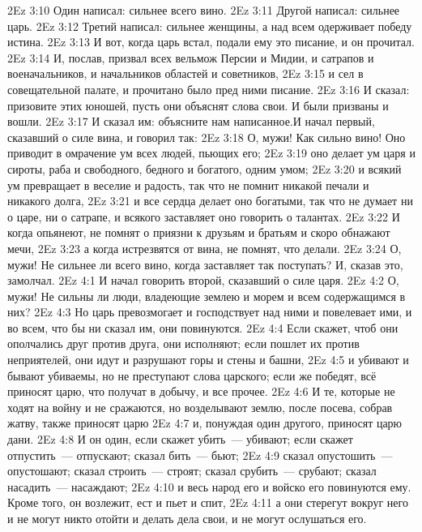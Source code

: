 \vs 2Ez 3:10 Один написал: сильнее всего вино.
\vs 2Ez 3:11 Другой написал: сильнее царь.
\vs 2Ez 3:12 Третий написал: сильнее женщины, а над всем одерживает победу истина.
\vs 2Ez 3:13 И вот, когда царь встал, подали ему это писание, и он прочитал.
\vs 2Ez 3:14 И, послав, призвал всех вельмож Персии и Мидии, и сатрапов и военачальников, и начальников областей и советников,
\vs 2Ez 3:15 и сел в совещательной палате, и прочитано было пред ними писание.
\vs 2Ez 3:16 И сказал: призовите этих юношей, пусть они объяснят слова свои. И были призваны и вошли.
\vs 2Ez 3:17 И сказал им: объясните нам написанное.\rsbpar И начал первый, сказавший о силе вина, и говорил так:
\vs 2Ez 3:18 О, мужи! Как сильно вино! Оно приводит в омрачение ум всех людей, пьющих его;
\vs 2Ez 3:19 оно делает ум царя и сироты, раба и свободного, бедного и богатого, одним умом;
\vs 2Ez 3:20 и всякий ум превращает в веселие и радость, так что  не помнит никакой печали и никакого долга,
\vs 2Ez 3:21 и все сердца делает оно богатыми, так что  не думает ни о царе, ни о сатрапе, и всякого заставляет оно говорить о  талантах.
\vs 2Ez 3:22 И когда опьянеют, не помнят о приязни к друзьям и братьям и скоро обнажают мечи,
\vs 2Ez 3:23 а когда истрезвятся от вина, не помнят, что делали.
\vs 2Ez 3:24 О, мужи! Не сильнее ли всего вино, когда заставляет так поступать? И, сказав это, замолчал.
\vs 2Ez 4:1 И начал говорить второй, сказавший о силе царя.
\vs 2Ez 4:2 О, мужи! Не сильны ли люди, владеющие землею и морем и всем содержащимся в них?
\vs 2Ez 4:3 Но царь превозмогает и господствует над ними и повелевает ими, и во всем, что бы ни сказал им, они повинуются.
\vs 2Ez 4:4 Если скажет, чтоб они ополчались друг против друга, они исполняют; если пошлет их против неприятелей, они идут и разрушают горы и стены и башни,
\vs 2Ez 4:5 и убивают и бывают убиваемы, но не преступают слова царского; если же победят, всё приносят царю, что получат в добычу, и все прочее.
\vs 2Ez 4:6 И те, которые не ходят на войну и не сражаются, но возделывают землю, после посева, собрав жатву, также приносят царю
\vs 2Ez 4:7 и, понуждая один другого, приносят царю дани.
\vs 2Ez 4:8 И он один, если скажет убить~--- убивают; если скажет отпустить~--- отпускают; сказал бить~--- бьют;
\vs 2Ez 4:9 сказал опустошить~--- опустошают; сказал строить~--- строят; сказал срубить~--- срубают; сказал насадить~--- насаждают;
\vs 2Ez 4:10 и весь народ его и войско его повинуются ему. Кроме того, он возлежит, ест и пьет и спит,
\vs 2Ez 4:11 а они стерегут вокруг него и не могут никто отойти и делать дела свои, и не могут ослушаться его.
